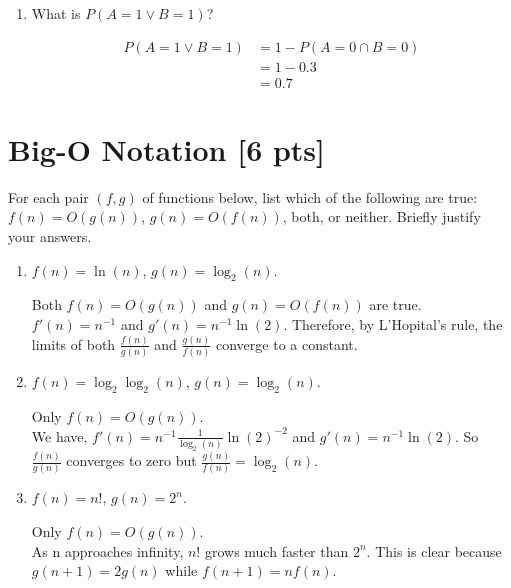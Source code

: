 \documentclass[a4paper]{article}
\theoremstyle{definition}
\newenvironment{soln}{
	\leavevmode\color{blue}\ignorespaces
}{}
\begin{document}
\begin{enumerate}
\begin{enumerate}
			\item 	What is $P(A = 1 \vee B = 1 )$?\\
		    \begin{soln}
				$$
				\begin{aligned}
					P(A = 1 \vee B = 1 ) & = 1 - P(A = 0 \cap B = 0 )\\
					& = 1 - 0.3\\
					& = 0.7
				\end{aligned}
				$$
			\end{soln}
		\end{enumerate}
	\end{enumerate}
	
	
	\section{Big-O Notation [6 pts]}
	For each pair $(f, g)$ of functions below, list which of the following
	are true: $f(n) = O(g(n))$, $g(n) = O(f(n))$, both, or
	neither. Briefly justify your answers.
	\begin{enumerate}
		\item 	$f(n) = \ln(n)$, $g(n) = \log_{2}(n)$.\\
		\begin{soln} 
			Both $f(n) = O(g(n))$ and $g(n) = O(f(n))$ are true.\\
			$f'(n) = n^{-1}$ and $g'(n) = n^{-1} \ln(2)$. Therefore, by L'Hopital's rule, the limits of both $\frac{f(n)}{g(n)}$ and $\frac{g(n)}{f(n)}$ converge to a constant.
		\end{soln}
		
		\item 	$f(n) =  \log_{2}\log_{2}(n)$, $g(n) = \log_{2}(n)$.\\
		\begin{soln} 
			Only $f(n) = O(g(n))$.\\
			We have, $f'(n) = n^{-1} \frac{1}{\log_{2}(n)} \ln(2)^{-2}$ and $g'(n) = n^{-1} \ln(2)$. So $\frac{f(n)}{g(n)}$ converges to zero but $\frac{g(n)}{f(n)} = \log_{2}(n)$.	
		\end{soln}
		
		\item 	$f(n) = n!$, $g(n) = 2^n$.\\
		\begin{soln} 
			Only $f(n) = O(g(n))$.\\
			As n approaches infinity, $n!$ grows much faster than $2^{n}$. This is clear because $g(n+1) = 2g(n)$ while $f(n+1) = nf(n)$. 
		\end{soln}
	\end{enumerate}
\end{document}
